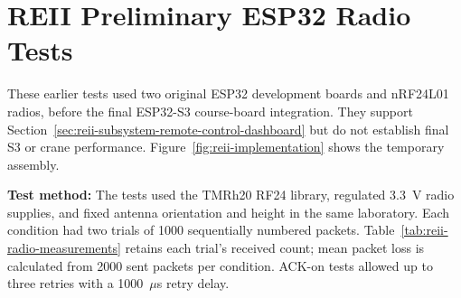 \clearpage
\section{REII Preliminary ESP32 Radio Tests}
\label{sec:reii-radio-tests}

These earlier tests used two original ESP32 development
boards and nRF24L01 radios, before the final ESP32-S3
course-board integration. They support
Section~\ref{sec:reii-subsystem-remote-control-dashboard}
but do not establish final S3 or crane performance.
Figure~\ref{fig:reii-implementation} shows the temporary
assembly.
\cite{reii_measurements2026}

\noindent
\textbf{Test method:}
The tests used the TMRh20 RF24 library, regulated 3.3~V
radio supplies, and fixed antenna orientation and height
in the same laboratory. Each condition had two trials
of 1000 sequentially numbered packets.
Table~\ref{tab:reii-radio-measurements} retains each
trial's received count; mean packet loss is calculated
from 2000 sent packets per condition. ACK-on tests
allowed up to three retries with a
1000~$\mu$s retry delay.

